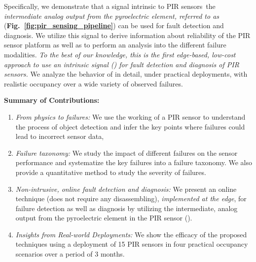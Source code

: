 Specifically, we demonstrate that a signal intrinsic to PIR sensors~\viz the \textit{intermediate analog output from the pyroelectric element, referred to as \aout} ({\bfseries Fig.~\ref{fig:pir_sensing_pipeline}}) can be used for %
fault detection and diagnosis. %
We utilize this signal to derive information about reliability of the PIR sensor platform as well as to perform an analysis into the different failure modalities. \textit{To the best of our knowledge, this is the first edge-based, low-cost approach to use an intrinsic signal (\aout) for fault detection and diagnosis of PIR sensors.} We analyze the behavior of \aout in detail, under %
practical deployments, with realistic occupancy
over a wide variety of observed failures. 

\noindent \textbf{Summary of Contributions:}
\begin{enumerate}[leftmargin=*]
	\itemsep0pt
	\item \textit{From physics to failures:} We use the working of a PIR sensor to understand the process of object detection and infer the key points where failures could lead to incorrect sensor data,
	\item \textit{Failure taxonomy:} We study the impact of different failures on the sensor performance and systematize the key failures into a failure taxonomy. We also provide a quantitative method to study the severity of failures.
	
	\item \textit{Non-intrusive, online fault detection and diagnosis:} We present an online technique (does not require any disassembling), \emph{implemented at the edge}, for failure detection as well as diagnosis by utilizing the intermediate, analog output from the pyroelectric element in the PIR sensor (\aout). 
	\item \textit{Insights from Real-world Deployments:} We show the efficacy of the proposed techniques using a deployment of 15 PIR sensors in four practical occupancy scenarios over a period of 3 months.
\end{enumerate}

